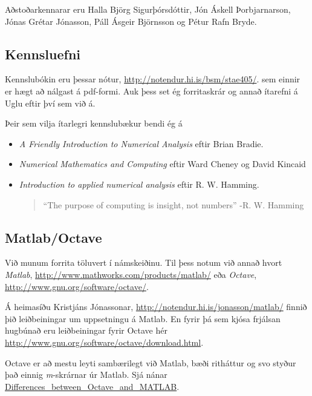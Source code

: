 \documentclass[letterpaper,10pt,icelandic]{sphinxmanual}
\begin{document}
Aðstoðarkennarar eru Halla Björg Sigurþórsdóttir, Jón Áskell Þorbjarnarson, Jónas Grétar Jónasson, Páll Ásgeir Björnsson og Pétur Rafn Bryde.


\subsection{Kennsluefni}
\label{vidauki:kennsluefni}
Kennslubókin eru þessar nótur, \href{http://notendur.hi.is/bsm/stae405/}{http://notendur.hi.is/bsm/stae405/}. sem einnir er hægt að nálgast á pdf-formi. Auk þess set ég forritaskrár og annað ítarefni á Uglu eftir því sem við á.

Þeir sem vilja ítarlegri kennslubækur bendi ég á
\begin{itemize}
\item {} 
\emph{A Friendly Introduction to Numerical Analysis} eftir Brian Bradie.

\item {} 
\emph{Numerical Mathematics and Computing} eftir Ward Cheney og David Kincaid

\item {} 
\emph{Introduction to applied numerical analysis} eftir R. W. Hamming.
\begin{quote}

``The purpose of computing is insight, not numbers'' -R. W. Hamming
\end{quote}

\end{itemize}


\subsection{Matlab/Octave}
\label{vidauki:matlab-octave}
Við munum forrita töluvert í námskeiðinu. Til þess notum við annað hvort \emph{Matlab}, \href{http://www.mathworks.com/products/matlab/}{http://www.mathworks.com/products/matlab/} eða \emph{Octave}, \href{http://www.gnu.org/software/octave/}{http://www.gnu.org/software/octave/}.

Á heimasíðu Kristjáns Jónassonar, \href{http://notendur.hi.is/jonasson/matlab/}{http://notendur.hi.is/jonasson/matlab/} finnið þið leiðbeiningar um uppsetningu á Matlab. En fyrir þá sem kjósa frjálsan hugbúnað eru leiðbeiningar fyrir Octave hér \href{http://www.gnu.org/software/octave/download.html}{http://www.gnu.org/software/octave/download.html}.

Octave er að mestu leyti sambærilegt við Matlab, bæði ritháttur og svo styður það einnig \emph{m}-skrárnar úr Matlab. Sjá nánar \href{http://en.wikibooks.org/wiki/MATLAB\_Programming/Differences\_between\_Octave\_and\_MATLAB}{Differences\_between\_Octave\_and\_MATLAB}.
\end{document}
